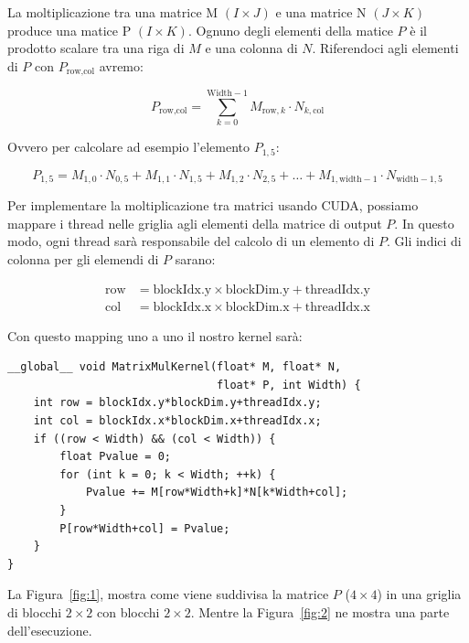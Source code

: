 \documentclass[a4paper]{article}
\begin{document}
La moltiplicazione tra una matrice M $(I\times{J})$ e una matrice N $(J\times{K})$ produce una matice P $(I\times{K})$. Ognuno degli elementi della matice $P$ è il prodotto scalare tra una riga di $M$ e una colonna di $N$. Riferendoci agli elementi di $P$ con $P_{\text{row}, \text{col}}$ avremo:

\[
P_{\text{row}, \text{col}} = \sum_{k=0}^{\text{Width}-1} M_{\text{row}, k} \cdot N_{k, \text{col}}
\]

Ovvero per calcolare ad esempio l'elemento $P_{1, 5}$:

\[
P_{1,5} = M_{1,0} \cdot N_{0,5} + M_{1,1} \cdot N_{1,5} + M_{1,2} \cdot N_{2,5} + \ldots + M_{1,\text{width}-1} \cdot N_{\text{width}-1,5}
\]

Per implementare la moltiplicazione tra matrici usando CUDA, possiamo mappare i thread nelle griglia agli elementi della matrice di output $P$. In questo modo, ogni thread sarà responsabile del calcolo di un elemento di $P$. Gli indici di colonna per gli elemendi di $P$ sarano:

\[
\begin{aligned}
\text{row} &= \text{blockIdx.y} \times \text{blockDim.y} + \text{threadIdx.y} \\
\text{col} &= \text{blockIdx.x} \times \text{blockDim.x} + \text{threadIdx.x}
\end{aligned}
\]

Con questo mapping uno a uno il nostro kernel sarà:

\begin{lstlisting}[caption={Kernel CUDA con memoria globale}, label={lst:1}]
__global__ void MatrixMulKernel(float* M, float* N,
                                float* P, int Width) {
    int row = blockIdx.y*blockDim.y+threadIdx.y;
    int col = blockIdx.x*blockDim.x+threadIdx.x;
    if ((row < Width) && (col < Width)) {
        float Pvalue = 0;
        for (int k = 0; k < Width; ++k) {
            Pvalue += M[row*Width+k]*N[k*Width+col];
        }
        P[row*Width+col] = Pvalue;
    }
}
\end{lstlisting}

\newpage

La Figura~\ref{fig:1}, mostra come viene suddivisa la matrice $P$ ($4\times{4}$) in una griglia di blocchi $2\times{2}$ con blocchi $2\times{2}$. Mentre la Figura~\ref{fig:2} ne mostra una parte dell'esecuzione.
\end{document}
